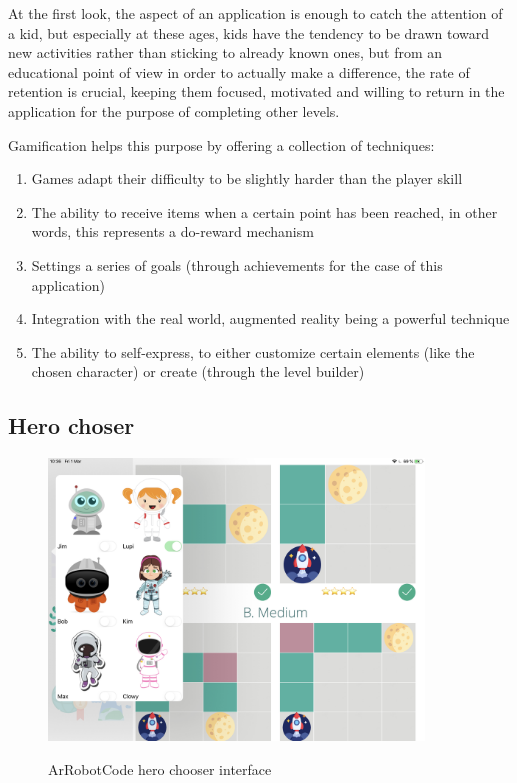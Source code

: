 \documentclass[12 pct]{report}
\begin{document}
At the first look, the aspect of an application is enough to catch the attention of a kid, but especially at these ages, kids have the tendency to be drawn toward new activities rather than sticking to already known ones, but from an educational point of view in order to actually make a difference, the rate of retention is crucial, keeping them focused, motivated and willing to return in the application for the purpose of completing other levels.


Gamification helps this purpose by offering a collection of techniques:

\begin{enumerate}
\item Games adapt their difficulty to be slightly harder than the player skill
\item The ability to receive items when a certain point has been reached, in other words, this represents a do-reward mechanism
\item Settings a series of goals (through achievements for the case of this application)
\item Integration with the real world, augmented reality being a powerful technique
\item The ability to self-express, to either customize certain elements (like the chosen character) or create (through the level builder)
\end{enumerate}
\subsection*{Hero choser}
\begin{figure}[H]
\includegraphics[width=0.89\textwidth]{ArRobotCode1}
\centering
\label{fig:feature-points}
\caption{ArRobotCode hero chooser interface}
\end{figure}
\end{document}

